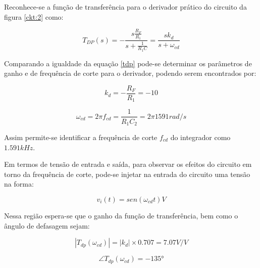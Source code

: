 Reconhece-se a função de transferência para o derivador prático do circuito da figura \ref{ckt:2} como:

\begin{center}
\begin{equation} \label{tdp}
        T_{DP}(s) = - \frac{s\frac{R_F}{R_1}}{s+\frac{1}{R_1C}} =  \frac{sk_d}{s+\omega_{cd}}
\end{equation}
\end{center}

Comparando a igualdade da equação \ref{tdp} pode-se determinar os parâmetros de ganho e de frequência de corte para o derivador, podendo serem encontrados por:

\begin{center}
\begin{equation} \label{tdp:1}
         k_d = - \frac{R_F}{R_1} = -10
\end{equation}
\end{center}

\begin{center}
\begin{equation} \label{tdp:2}
       \omega_{cd} = 2 \pi f_{cd} = \frac{1}{R_1C_2} = 2 \pi 1591 rad/s
\end{equation}
\end{center}

Assim permite-se identificar a frequência de corte $f_{cd}$ do integrador como $1.591kHz$.

Em termos de tensão de entrada e saída, para observar os efeitos do circuito em torno da frequência de corte, pode-se injetar na entrada do circuito uma tensão na forma:

\begin{center}
\begin{equation} \label{der:1}
       v_i(t) = sen(\omega_{cd}t) V
\end{equation}
\end{center}

Nessa região espera-se que o ganho da função de transferência, bem como o ângulo de defasagem sejam:

\begin{center}
\begin{equation} \label{der:1}
       |T_{dp}(\omega_{cd})| = |k_d| \times 0.707  = 7.07 V/V
\end{equation}
\end{center}

\begin{center}
\begin{equation} \label{der:2}
       \angle T_{dp}(\omega_{cd})  = -135°
\end{equation}
\end{center}

